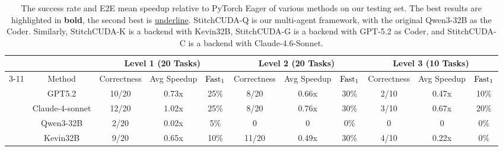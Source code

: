 \begin{table}[h]
\caption{The success rate and E2E mean speedup relative to PyTorch Eager of various methods on our testing set. The best results are highlighted in \textbf{bold}, the second best is \underline{underline}. StitchCUDA-Q is our multi-agent framework, with the original Qwen3-32B as the Coder. Similarly, StitchCUDA-K is a backend with Kevin32B, StitchCUDA-G is a backend with GPT-5.2 as Coder, and StitchCUDA-C is a backend with Claude-4.6-Sonnet.}
\label{tab:l3}
{\fontsize{7}{8}\selectfont
\begin{tabular}{c|c|ccc|ccc|ccc}
\hline
                                                                                 &                                    & \multicolumn{3}{c|}{Level 1 (20 Tasks)}                       & \multicolumn{3}{c|}{Level 2 (20 Tasks)}                       & \multicolumn{3}{c}{Level 3 (10 Tasks)}                                                           \\ \cline{3-11} 
\multirow{-2}{*}{Hardware}                                                       & \multirow{-2}{*}{Method}           & Correctness    & Avg Speedup    & $\rm{Fast}_1$           & Correctness    & Avg Speedup    & $\rm{Fast}_1$ & Correctness                 & Avg Speedup                  & $\rm{Fast}_1$                   \\ \hline
                                                                                 & GPT5.2                             & 10/20          & 0.73x          & 25\%          & 8/20           & 0.66x          & 30\%             & 2/10                        & 0.47x                        & 10\%                     \\
                                                                                 & Claude-4-sonnet                    & 12/20          & 1.02x          & 25\%             & 8/20           & 0.76x          & 30\%             & 3/10                        & 0.67x                        & 20\%                     \\
                                                                                 & Qwen3-32B                          & 2/20           & 0.02x          & 5\%           & 0            & 0              & 0\%                & 0                           & 0                            & 0\%                     \\
                                                                                 & Kevin32B                           & 9/20           & 0.65x          & 10\%             & 11/20          & 0.49x          & 30\%             & 4/10                        & 0.22x                        & 0\%                        \\

\end{tabular}}
\end{table}
